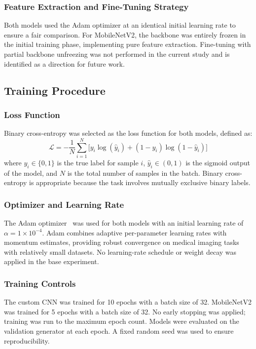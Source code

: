 \documentclass[preprint,12pt]{elsarticle}
\begin{document}
\subsubsection{Feature Extraction and Fine-Tuning Strategy}
Both models used the Adam optimizer at an identical initial learning
rate to ensure a fair comparison.
For MobileNetV2, the backbone was entirely frozen in the initial
training phase, implementing pure feature extraction.
Fine-tuning with partial backbone unfreezing was not performed in the
current study and is identified as a direction for future work.

\subsection{Training Procedure}

\subsubsection{Loss Function}
Binary cross-entropy was selected as the loss function for both models,
defined as:
\begin{equation}
  \mathcal{L} = -\frac{1}{N}\sum_{i=1}^{N}
    \bigl[y_i \log(\hat{y}_i) + (1-y_i)\log(1-\hat{y}_i)\bigr]
  \label{Eq:BinaryCrossEntropy}
\end{equation}
where $y_i \in \{0,1\}$ is the true label for sample $i$,
$\hat{y}_i \in (0,1)$ is the sigmoid output of the model,
and $N$ is the total number of samples in the batch.
Binary cross-entropy is appropriate because the task involves
mutually exclusive binary labels.

\subsubsection{Optimizer and Learning Rate}
The Adam optimizer~\cite{tensorflow} was used for both models with an
initial learning rate of $\alpha = 1 \times 10^{-4}$.
Adam combines adaptive per-parameter learning rates with momentum
estimates, providing robust convergence on medical imaging tasks with
relatively small datasets.
No learning-rate schedule or weight decay was applied in the base
experiment.

\subsubsection{Training Controls}
The custom CNN was trained for 10 epochs with a batch size of 32.
MobileNetV2 was trained for 5 epochs with a batch size of 32.
No early stopping was applied; training was run to the maximum epoch
count.
Models were evaluated on the validation generator at each epoch.
A fixed random seed was used to ensure reproducibility.
\end{document}
